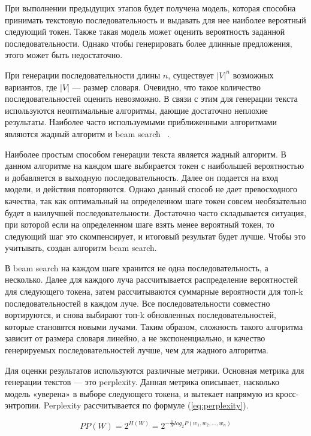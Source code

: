 При выполнении предыдущих этапов будет получена модель, которая способна принимать текстовую последовательность и выдавать для нее наиболее вероятный следующий токен. Также такая модель может оценить вероятность заданной последовательности. Однако чтобы генерировать более длинные предложения, этого может быть недостаточно.

При генерации последовательности длины $n$, существует $|V|^{n}$ возможных вариантов, где $|V|$ --- размер словаря. Очевидно, что такое количество последовательностей оценить невозможно. В связи с этим для генерации текста используются неоптимальные алгоритмы, дающие достаточно неплохие результаты. Наиболее часто используемыми приближенными алгоритмами являются жадный алгоритм и beam search ~\cite{beam_search}.

Наиболее простым способом генерации текста является жадный алгоритм. В данном алгоритме на каждом шаге выбирается токен с наибольшей вероятностью и добавляется в выходную последовательность. Далее он подается на вход модели, и действия повторяются. Однако данный способ не дает превосходного качества, так как оптимальный на определенном шаге токен совсем необязательно будет в наилучшей последовательности. Достаточно часто складывается ситуация, при которой если на определенном шаге взять менее вероятный токен, то следующий шаг это скомпенсирует, и итоговый результат будет лучше. Чтобы это учитывать, создан алгоритм beam search.

В beam search на каждом шаге хранится не одна последовательность, а несколько. Далее для каждого луча рассчитывается распределение вероятностей для следующего токена, затем рассчитываются суммарные вероятности для топ-k последовательностей в каждом луче. Все последовательности совместно вортируются, и снова выбирают топ-k обновленных последовательностей, которые становятся новыми лучами. Таким образом, сложность такого алгоритма зависит от размера словаря линейно, а не экспоненциально, и качество генерируемых последовательностей лучше, чем для жадного алгоритма.

Для оценки результатов используются различные метрики. Основная метрика для генерации текстов --- это perplexity. Данная метрика описывает, насколько модель «уверена» в выборе следующего токена, и вытекает напрямую из кросс-энтропии. Perplexity рассчитывается по формуле (\ref{eq:perplexity}). 

\begin{equation}
	PP(W) = 2^{H(W)} = 2^{-\frac{1}{N}log_2P(w_1, w_2,\dots,w_n)}
	\label{eq:perplexity}
\end{equation}

